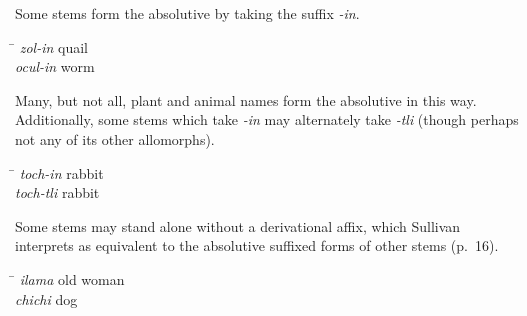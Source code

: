 \documentclass[doc,12pt,natbib]{apa6}
\begin{document}
Some stems form the absolutive by taking the suffix \textit{-in}.
\begin{exe}
	\ex 
	\begin{tabbing}
		\hspace*{2cm}\= \kill
		\textit{zol-in} \> quail \\
		\textit{ocul-in} \> worm
	\end{tabbing}
\end{exe}
Many, but not all, plant and animal names form the absolutive in this way.
Additionally, some stems which take \textit{-in} may alternately take
\textit{-tli} (though perhaps not any of its other allomorphs).
\begin{exe}
	\ex
	\begin{tabbing}
		\hspace*{2cm}\= \kill
		\textit{toch-in} \> rabbit \\
		\textit{toch-tli} \> rabbit
	\end{tabbing}
\end{exe}

Some stems may stand alone without a derivational affix, which Sullivan
interprets as equivalent to the absolutive suffixed forms of other stems
(p.~16).
\begin{exe}
	\ex
	\begin{tabbing}
		\hspace*{2cm}\= \kill
		\textit{ilama} \> old woman \\
		\textit{chichi} \> dog
	\end{tabbing}
\end{exe}

\nocite{Sullivan88}

\clearpage

\end{document}
